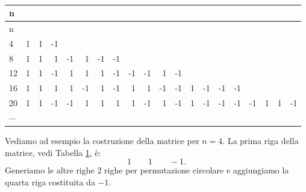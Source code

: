 \documentclass[
  11pt,
]{book}
\begin{document}
\begin{longtable}[]{@{}lrrrrrrrrrrrrrrrrrrr@{}}
\caption{\label{tab:PBAlg}}\tabularnewline
\toprule
n & & & & & & & & & & & & & & & & & & & \\
\midrule
\endfirsthead
\toprule
n & & & & & & & & & & & & & & & & & & & \\
\midrule
\endhead
4 & 1 & 1 & -1 & & & & & & & & & & & & & & & & \\
8 & 1 & 1 & 1 & -1 & 1 & -1 & -1 & & & & & & & & & & & & \\
12 & 1 & 1 & -1 & 1 & 1 & 1 & -1 & -1 & -1 & 1 & -1 & & & & & & & & \\
16 & 1 & 1 & 1 & 1 & -1 & 1 & -1 & 1 & 1 & -1 & -1 & 1 & -1 & -1 & -1 & & & & \\
20 & 1 & 1 & -1 & -1 & 1 & 1 & 1 & 1 & -1 & 1 & -1 & 1 & -1 & -1 & -1 & -1 & 1 & 1 & -1 \\
\(\cdots\) & & & & & & & & & & & & & & & & & & & \\
\bottomrule
\end{longtable}

Vediamo ad esempio la costruzione della matrice per \(n=4.\) La prima riga della matrice, vedi Tabella \ref{tab:PBAlg}, è:\\
\begin{equation*}
    1 \qquad 1 \qquad -1.
\end{equation*}
Generiamo le altre righe \(2\) righe per permutazione circolare e aggiungiamo la quarta riga costituita da \(-1\).
\end{document}
